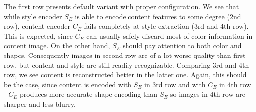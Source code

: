\documentclass[../Main.tex]{subfiles}
\begin{document}
The first row presents default variant with proper configuration. 
We see that while style encoder $S_E$ is able to encode content features to some
degree (2nd row), content encoder $C_E$ fails completely at style extraction
(3rd and 4th row). This is expected, since $C_E$ can usually safely
discard most of color information in content image. On the other hand, $S_E$
should pay attention to both color and shapes. Consequently images in second row
are of a lot worse quality than first row, but content and style are still readily
recognizable. Comparing 3rd and 4th row, we see content 
is reconstructed better in the latter one. Again, this should be the case,
since content is encoded with $S_E$ in 3rd row and with $C_E$ in 4th row -
$C_E$ produces more accurate shape encoding than $S_E$ so images in 4th row are
sharper and less blurry.





\biblio %
\end{document}
